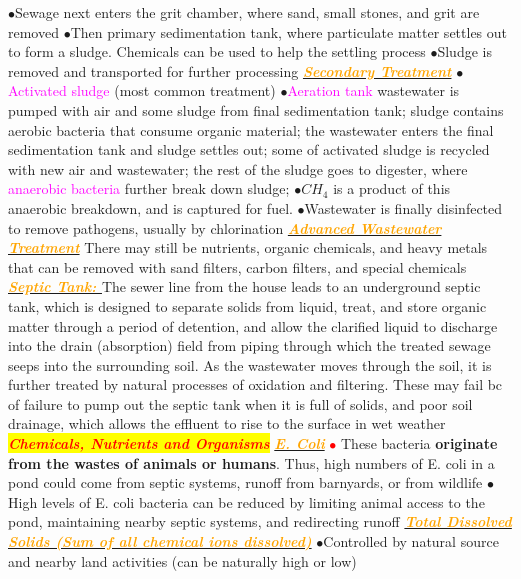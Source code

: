 \documentclass{article}
\newcommand{\ddd}{$\bullet$}
\newcommand{\red}[1]{\textcolor{red}{#1}}
\newcommand{\pink}[1]{\textcolor{magenta}{#1}}
\newcommand{\orange}[1]{\textcolor{orange}{#1}}
\newcommand{\mysection}[1]{\colorbox{yellow}{\textbf{\textit{\red{#1}}}}}
\newcommand{\mysubsection}[1]{\underline{\textbf{{\textit{\orange{#1}}}}}}
\newcommand{\vocab}[1]{{\pink{#1}}}
\begin{document}
\begin{multicols*}{4}
            \ddd Sewage next enters the grit chamber, where sand, small stones, and grit are removed
            \ddd Then primary sedimentation tank, where particulate matter settles out to form a sludge. Chemicals can be used to help the settling process
            \ddd Sludge is removed and transported for further processing
    	 \mysubsection{Secondary Treatment}
    	    \ddd \vocab{Activated sludge} (most common treatment)
    	    \ddd \vocab{Aeration tank} wastewater is pumped with air and some sludge from final sedimentation tank; sludge contains aerobic bacteria that consume organic material; the wastewater enters the final sedimentation tank and sludge settles out; some of activated sludge is recycled with new air and wastewater; the rest of the sludge goes to digester, where \vocab{anaerobic bacteria} further break down sludge;
    	    \ddd $CH_4$ is a product of this anaerobic breakdown, and is captured for fuel. 
    	    \ddd Wastewater is finally disinfected to remove pathogens, usually by chlorination
    	  \mysubsection{Advanced Wastewater Treatment}
    	    There may still be nutrients, organic chemicals, and heavy metals that can be removed with sand filters, carbon filters, and special chemicals        
        \mysubsection{Septic Tank: } 
        	The sewer line from the house leads to an underground septic tank, which is designed to separate solids from liquid, treat, and store organic matter through a period of detention, and allow the clarified liquid to discharge into the drain (absorption) field from piping through which the treated sewage seeps into the surrounding soil. As the wastewater moves through the soil, it is further treated by natural processes of oxidation and filtering. These may fail bc of failure to pump out the septic tank when it is full of solids, and poor soil drainage, which allows the effluent to rise to the surface in wet weather
            \\
    \mysection{Chemicals, Nutrients and Organisms}
        \mysubsection{E. Coli}
            \red{\ddd} These bacteria \textbf{originate from the wastes of animals or humans}. Thus, high numbers of E. coli in a pond could come from septic systems, runoff from barnyards, or from wildlife
            \ddd High levels of E. coli bacteria can be reduced by limiting animal access to the pond, maintaining nearby septic systems, and redirecting runoff
        \mysubsection{Total Dissolved Solids (Sum of all chemical ions dissolved)}
            \ddd Controlled by natural source and nearby land activities (can be naturally high or low)

\end{multicols*}
\end{document}
